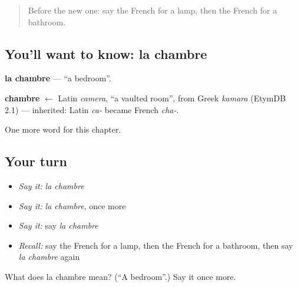 \label{lesson:FR-C74-chambre}



\begin{quote}
Before the new one: say the French for a lamp, then the French for a bathroom.
\end{quote}

\subsection*{You'll want to know: la chambre}
\textbf{la chambre} — \textquotedblleft{}a bedroom\textquotedblright{}.

\begin{cousinweb}
\textbf{chambre} $\leftarrow$ Latin \emph{camera}, \textquotedblleft{}a vaulted room\textquotedblright{}, from Greek \emph{kamara} (EtymDB 2.1) — inherited: Latin \emph{ca-} became French \emph{cha-}.
\end{cousinweb}

\begin{grammarlens}[title={What you've built}]
One more word for this chapter.
\end{grammarlens}

\subsection*{Your turn}
\begin{itemize}
\raggedright
  \item \emph{Say it:} \emph{la chambre}
  \item \emph{Say it:} \emph{la chambre}, once more
  \item \emph{Say it:} say \emph{la chambre}
  \item \emph{Recall:} say the French for a lamp, then the French for a bathroom, then say \emph{la chambre} again
\end{itemize}

\begin{tcolorbox}[breakable,colback=teal!4,colframe=teal!35!black,title={Before you move on}]
What does la chambre mean? (\textquotedblleft{}A bedroom\textquotedblright{}.) Say it once more.
\end{tcolorbox}
